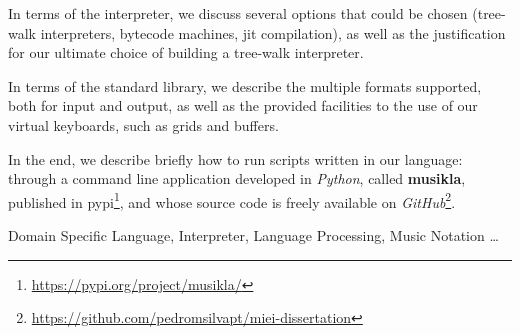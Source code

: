 In terms of the interpreter, we discuss several options that could be chosen (tree-walk interpreters, bytecode machines, \acrshort{jit} compilation), as well as the justification for our ultimate choice of building a tree-walk interpreter.

In terms of the standard library, we describe the multiple formats supported, both for input and output, as well as the provided facilities to the use of our virtual keyboards, such as grids and buffers.

In the end, we describe briefly how to run scripts written in our language: through a command line application developed in \textit{Python}, called \textbf{musikla}, published in \acrfull{pypi}\footnote{\url{https://pypi.org/project/musikla/}}, and whose source code is freely available on \textit{GitHub}\footnote{\url{https://github.com/pedromsilvapt/miei-dissertation}}.

\begin{keywords}
Domain Specific Language, Interpreter, Language Processing, Music Notation \ldots
\end{keywords} 

